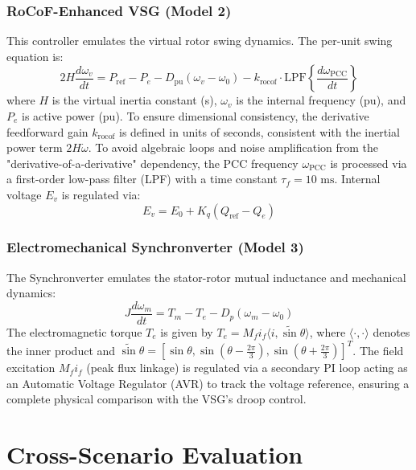 \documentclass[conference]{IEEEtran}
\begin{document}
\subsubsection{RoCoF-Enhanced VSG (Model 2)}
This controller emulates the virtual rotor swing dynamics. The per-unit swing equation is:
\begin{equation}
2H \frac{d\omega_v}{dt} = P_{\text{ref}} - P_e - D_{\text{pu}}(\omega_v - \omega_0) - k_{\text{rocof}} \cdot \text{LPF}\left\{ \frac{d\omega_{\text{PCC}}}{dt} \right\}
\label{eq:vsg_swing}
\end{equation}
where $H$ is the virtual inertia constant (s), $\omega_v$ is the internal frequency (pu), and $P_e$ is active power (pu). To ensure dimensional consistency, the derivative feedforward gain $k_{\text{rocof}}$ is defined in units of seconds, consistent with the inertial power term $2H\dot{\omega}$. To avoid algebraic loops and noise amplification from the "derivative-of-a-derivative" dependency, the PCC frequency $\omega_{\text{PCC}}$ is processed via a first-order low-pass filter (LPF) with a time constant $\tau_f = 10\text{ ms}$. Internal voltage $E_v$ is regulated via:
\begin{equation}
E_v = E_0 + K_q (Q_{\text{ref}} - Q_e)
\label{eq:v_droop}
\end{equation}

\subsubsection{Electromechanical Synchronverter (Model 3)}
The Synchronverter emulates the stator-rotor mutual inductance and mechanical dynamics:
\begin{equation}
J \frac{d\omega_m}{dt} = T_m - T_e - D_p(\omega_m - \omega_0)
\label{eq:sync_swing}
\end{equation}
The electromagnetic torque $T_e$ is given by $T_e = M_f i_f \langle i, \widetilde{\sin}\theta \rangle$, where $\langle \cdot, \cdot \rangle$ denotes the inner product and $\widetilde{\sin}\theta = [\sin\theta, \sin(\theta - \frac{2\pi}{3}), \sin(\theta + \frac{2\pi}{3})]^T$. The field excitation $M_f i_f$ (peak flux linkage) is regulated via a secondary PI loop acting as an Automatic Voltage Regulator (AVR) to track the voltage reference, ensuring a complete physical comparison with the VSG's droop control.

\section{Cross-Scenario Evaluation}\label{sec:experiments}
\end{document}
